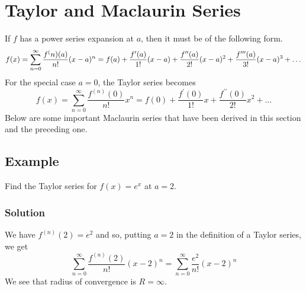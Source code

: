 \section{Taylor and Maclaurin Series}
If $f$ has a power series expansion at $a$, then it must be of the following form.
\begin{equation}
    f(x) = \sum^\infty_{n = 0} \frac{f^(n)(a)}{n!}(x-a)^n\\
         = f(a) + \frac{f^\prime(a)}{1!}(x - a) + \frac{f^{\prime\prime}(a)}{2!}(x - a)^2 + 
         \frac{f^{\prime\prime\prime}(a)}{3!}(x - a)^3 + \dots
\end{equation}
For the special case $a = 0$, the Taylor series becomes
$$f(x) = \sum^\infty_{n = 0} \frac{f^(n)(0)}{n!}x^n = f(0) + \frac{f^\prime(0)}{1!}x + \frac{f^{\prime\prime}(0)}{2!}x^2 + \dots$$
Below are some important Maclaurin series that have been derived in this section and the preceding one. 

\subsection*{Example}
Find the Taylor series for $f(x) = e^x$ at $a = 2$.
\subsubsection*{Solution}
We have $f^(n)(2) = e^2$ and so, putting $a = 2$ in the definition of a Taylor series, we get 
$$\sum^\infty_{n = 0}\frac{f^(n)(2)}{n!} (x - 2)^n = \sum^\infty_{n = 0} \frac{e^2}{n!}(x - 2)^n$$
We see that radius of convergence is $R = \infty$.



